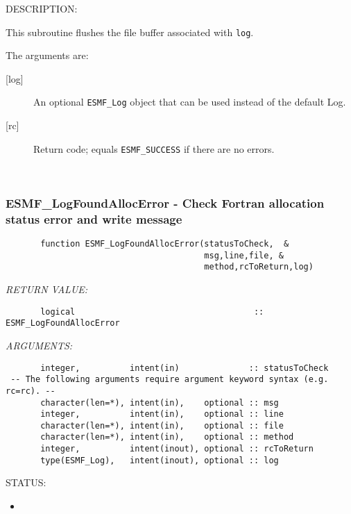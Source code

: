 {\sf DESCRIPTION:\\ }


        This subroutine flushes the file buffer associated with {\tt log}.
  
        The arguments are:
        \begin{description}
  
        \item [{[log]}]
              An optional {\tt ESMF\_Log} object that can be used instead
              of the default Log.
        \item [{[rc]}]
              Return code; equals {\tt ESMF\_SUCCESS} if there are no errors.
        \end{description}
   
 
\mbox{}\hrulefill\ 
 
\subsubsection [ESMF\_LogFoundAllocError] {ESMF\_LogFoundAllocError - Check Fortran allocation status error and write message}


 
\begin{verbatim}       function ESMF_LogFoundAllocError(statusToCheck,  &
                                        msg,line,file, &
                                        method,rcToReturn,log)\end{verbatim}{\em RETURN VALUE:}
\begin{verbatim}       logical                                    :: ESMF_LogFoundAllocError\end{verbatim}{\em ARGUMENTS:}
\begin{verbatim}       integer,          intent(in)              :: statusToCheck
 -- The following arguments require argument keyword syntax (e.g. rc=rc). --
       character(len=*), intent(in),    optional :: msg
       integer,          intent(in),    optional :: line
       character(len=*), intent(in),    optional :: file
       character(len=*), intent(in),    optional :: method
       integer,          intent(inout), optional :: rcToReturn
       type(ESMF_Log),   intent(inout), optional :: log
 \end{verbatim}
{\sf STATUS:}
   \begin{itemize}
   \item{}
   \end{itemize}
  
